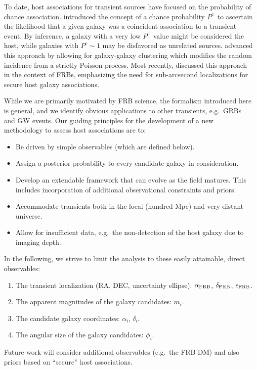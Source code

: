 \documentclass[twocolumn,linenumbers]{aastex63}
\newcommand{\mgmag}{m}
\newcommand{\mragal}{\alpha_i} %
\newcommand{\ragal}{$\mragal$}
\newcommand{\mdecgal}{\delta_i} %
\newcommand{\decgal}{$\mdecgal$}
\newcommand{\mgalhalflight}{\phi_{i}} %
\newcommand{\galhalflight}{$\mgalhalflight$}
\newcommand{\mrafrb}{\alpha_{\rm FRB}} %
\newcommand{\rafrb}{$\mrafrb$}
\newcommand{\mdecfrb}{\delta_{\rm FRB}} %
\newcommand{\decfrb}{$\mdecfrb$}
\newcommand{\meefrb}{\epsilon_{\rm FRB}} %
\newcommand{\eefrb}{$\meefrb$}
\newcommand{\mpchance}{P^c}
\newcommand{\pchance}{$\mpchance$}
\begin{document}
To date, host associations for transient sources have focused
on the probability of chance association.
\cite{Bloom02} introduced the concept of a chance
probability \pchance\ 
to ascertain the likelihood that a given galaxy was
a coincident association to a transient event.
By inference, a galaxy with a very low \pchance\ value 
might be considered the host,
while galaxies with $\mpchance \sim 1$ may be disfavored
as unrelated sources.
\cite{Tunnicliffe14} advanced this approach by allowing
for galaxy-galaxy clustering which modifies the random 
incidence from a strictly Poisson process.
Most recently, \cite{EftekhariBerger2017} discussed
this approach in the context of FRBs, emphasizing the
need for sub-arcsecond localizations for secure
host galaxy associations.

While we are primarily motivated by FRB science, 
the formalism introduced here is general, and
we identify obvious applications to other
transients, e.g.\ GRBs and GW events.
Our guiding principles for the development of a new
methodology to assess host associations are to:

\begin{itemize}
 \item Be driven by simple observables (which are defined below).
 \item Assign a posterior probability to every candidate galaxy in consideration.
 \item Develop an extendable framework that can evolve as the 
 field matures.  This includes incorporation of
 additional observational constraints and priors.
 \item Accommodate transients both in the local 
 (hundred Mpc) and very distant universe. 
 \item Allow for insufficient data, e.g.\ the non-detection
 of the host galaxy due to imaging depth.
\end{itemize}

In the following, we strive to limit the analysis to
these easily attainable, direct observables:

\begin{enumerate}
    \item The transient localization (RA, DEC, uncertainty ellipse): 
    \rafrb, \decfrb, \eefrb.
    \item The apparent magnitudes of the galaxy candidates:
    $\mgmag_i$.
    \item The candidate galaxy coordinates:
    \ragal, \decgal.
    \item The angular size of the
    galaxy candidates: \galhalflight.
\end{enumerate}
Future work will consider additional observables (e.g.\ the FRB DM) 
and also priors based on ``secure'' host associations.
\end{document}
